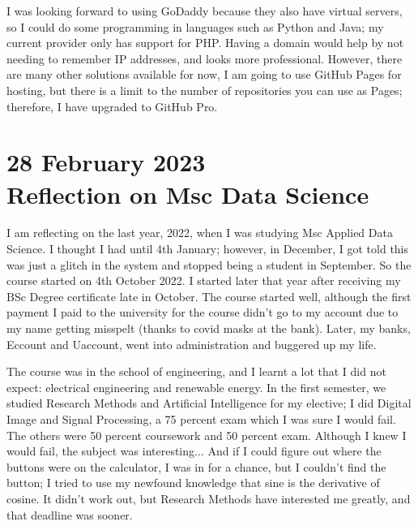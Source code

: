 \documentclass{article}
\begin{document}
I was looking forward to using GoDaddy because they also have virtual servers, so I could do some programming in languages such as Python and Java; my current provider only has support for PHP. Having a domain would help by not needing to remember IP addresses, and looks more professional. However, there are many other solutions available for now, I am going to use GitHub Pages for hosting, but there is a limit to the number of repositories you can use as Pages; therefore, I have upgraded to GitHub Pro.

\newpage
\section*{28 February 2023 \\ Reflection on Msc Data Science}


I am reflecting on the last year, 2022, when I was studying Msc Applied Data Science. I thought I had until 4th January; however, in December, I got told this was just a glitch in the system and stopped being a student in September. So the course started on 4th October 2022. I started later that year after receiving my BSc Degree certificate late in October. The course started well, although the first payment I paid to the university for the course didn't go to my account due to my name getting misspelt (thanks to covid masks at the bank). Later, my banks, Eccount and Uaccount, went into administration and buggered up my life.

The course was in the school of engineering, and I learnt a lot that I did not expect:  electrical engineering and renewable energy. In the first semester, we studied Research Methods and Artificial Intelligence for my elective; I did Digital Image and Signal Processing, a 75 percent exam which I was sure I would fail. The others were 50 percent coursework and 50 percent exam. Although I knew I would fail, the subject was interesting...  And if I could figure out where the buttons were on the calculator, I was in for a chance, but I couldn't find the button; I tried to use my newfound knowledge that sine is the derivative of cosine. It didn't work out, but Research Methods have interested me greatly, and that deadline was sooner.
 
\end{document}

